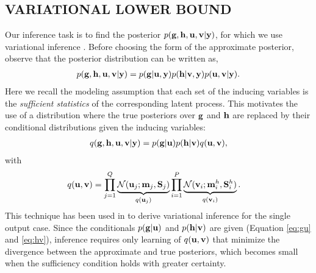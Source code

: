 \subsection{VARIATIONAL LOWER BOUND \label{sec:variationalLowerBound}}
\newcommand{\ug}{\u_g}
\newcommand{\uh}{\u^h}
\newcommand{\mgj}{\m_j}
\newcommand{\mhi}{\m^h_i}
\newcommand{\Sgj}{\S_j}
\newcommand{\Shi}{\S^h_i}
Our inference task is to find the posterior $p(\mathbf{g}, \mathbf{h}, \mathbf{u}, \mathbf{v} | \mathbf{y})$, for which we use variational inference \citep{jordan-variational-99}. 
Before choosing the form of the approximate posterior, observe that the posterior distribution can be written as,
\begin{align}
p(\mathbf{g}, \mathbf{h}, \mathbf{u}, \mathbf{v} | \mathbf{y}) = p(\mathbf{g} | \mathbf{u}, \mathbf{y}) p(\mathbf{h} | \mathbf{v}, \mathbf{y}) p(\mathbf{u}, \mathbf{v} | \mathbf{y}).
\end{align}
Here we recall the modeling assumption that each set of the inducing variables is the \emph{sufficient statistics} of the corresponding latent process. 
This motivates the use of a distribution where the true posteriors over $\mathbf{g}$ and $\mathbf{h}$ are replaced by their conditional distributions given the inducing variables:
\begin{align}
q(\mathbf{g}, \mathbf{h}, \mathbf{u}, \mathbf{v} | \mathbf{y})
= p(\mathbf{g}|\mathbf{u}) p(\mathbf{h}|\mathbf{v}) q(\mathbf{u},\mathbf{v}),
\end{align}
with
\begin{align}
q(\u,\v) &= \prod_{j=1}^Q \underbrace{\Normal(\u_j; \mgj, \Sgj)}_{q(\u_j)} \prod_{i=1}^P  \underbrace{\Normal(\v_i; \mhi, \Shi)}_{q(\v_i)}.
\end{align}
This technique has been used in \citep{titsiasvariational,hensmangaussian} to derive variational inference for the single output case.
Since the conditionals $p(\mathbf{g} | \mathbf{u})$ and $p(\mathbf{h} | \mathbf{v})$ are given (Equation \ref{eq:gu} and \ref{eq:hv}), inference requires only learning of $q(\mathbf{u}, \mathbf{v})$ that minimize the divergence between the approximate and true posteriors, which becomes small when the sufficiency condition holds with greater certainty.

